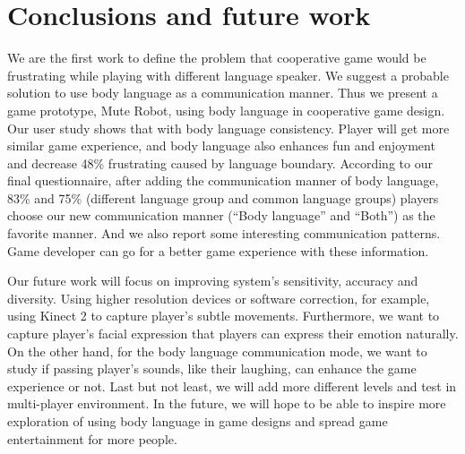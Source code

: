 \section{Conclusions and future work}



We are the first work to define the problem that cooperative game would be frustrating while playing with different language speaker. We suggest a probable solution to use body language as a communication manner. Thus we present a game prototype, Mute Robot, using body language in cooperative game design. Our user study shows that with body language consistency. Player will get more similar game experience, and body language also enhances fun and enjoyment and decrease 48\% frustrating caused by language boundary. According to our final questionnaire, 
after adding the communication manner of body language, 83\% and 75\% (different language group and common language groups) players choose our new communication manner (``Body language'' and ``Both'') as the favorite manner. 
And we also report some interesting communication patterns. Game developer can go for a better game experience with these information.

Our future work will focus on improving system's sensitivity, accuracy and diversity. Using higher resolution devices or software correction, for example, using Kinect 2 to capture player's subtle movements. Furthermore, we want to capture player's facial expression that players can express their emotion naturally.  
On the other hand, for the body language communication mode, we want to study if passing player's sounds, like their laughing, can enhance the game experience or not. Last but not least, we will add more different levels and test in multi-player environment. In the future, we will hope to be able to inspire more exploration of using body language in game designs and spread game entertainment for more people.


